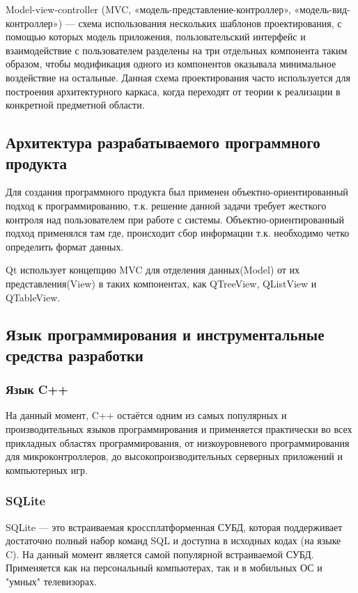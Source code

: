 Model-view-controller (MVC, «модель-представление-контроллер», «модель-вид-контроллер») — схема использования нескольких
шаблонов проектирования, с помощью которых модель приложения, пользовательский интерфейс и взаимодействие с пользователем
разделены на три отдельных компонента таким образом, чтобы модификация одного из компонентов оказывала минимальное
воздействие на остальные. Данная схема проектирования часто используется для построения архитектурного каркаса,
когда переходят от теории к реализации в конкретной предметной области.

\subsection{Архитектура разрабатываемого программного продукта}

Для создания программного продукта был применен объектно-ориентированный подход к программированию,
т.к. решение данной задачи требует жесткого контроля над пользователем при работе с системы.
Объектно-ориентированный подход применялся там где, происходит сбор информации т.к. необходимо четко определить формат данных.

Qt использует концепцию MVC для отделения данных(Model) от их представления(View) в таких компонентах, как QTreeView, QListView и
QTableView.

\subsection{Язык программирования и инструментальные средства разработки}

\subsubsection{Язык C++}
На данный момент, C++ остаётся одним из самых популярных и производительных языков программирования и применяется практически во всех прикладных областях
программирования, от низкоуровневого программирования для микроконтроллеров, до высокопроизводительных серверных приложений и компьютерных игр.

\subsubsection{SQLite}
SQLite — это встраиваемая кроссплатформенная СУБД, которая поддерживает достаточно полный набор команд SQL и доступна в исходных кодах (на языке C). На данный
момент является самой популярной встраиваемой СУБД. Применяется как на персональный компьютерах, так и в мобильных ОС и "умных" телевизорах.

